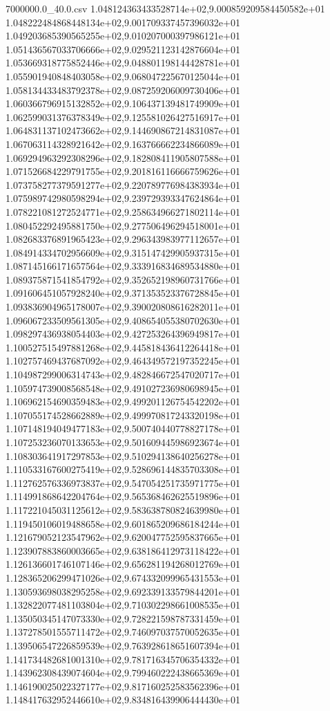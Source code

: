 \begin{filecontents*}{7000000.0_40.0.csv}
1.048124363433528714e+02,9.000859209584450582e+01
1.048222484868448134e+02,9.001709337457396032e+01
1.049203685390565255e+02,9.010207000397986121e+01
1.051436567033706666e+02,9.029521123142876604e+01
1.053669318775852446e+02,9.048801198144428781e+01
1.055901940848403058e+02,9.068047225670125044e+01
1.058134433483792378e+02,9.087259206009730406e+01
1.060366796915132852e+02,9.106437139481749909e+01
1.062599031376378349e+02,9.125581026427516917e+01
1.064831137102473662e+02,9.144690867214831087e+01
1.067063114328921642e+02,9.163766662234866089e+01
1.069294963292308296e+02,9.182808411905807588e+01
1.071526684229791755e+02,9.201816116666759626e+01
1.073758277379591277e+02,9.220789776984383934e+01
1.075989742980598294e+02,9.239729393347624864e+01
1.078221081272524771e+02,9.258634966271802114e+01
1.080452292495881750e+02,9.277506496294518001e+01
1.082683376891965423e+02,9.296343983977112657e+01
1.084914334702956609e+02,9.315147429905937315e+01
1.087145166171657564e+02,9.333916834689534880e+01
1.089375871541854792e+02,9.352652198960731766e+01
1.091606451057928240e+02,9.371353523376728845e+01
1.093836904965178007e+02,9.390020808616282011e+01
1.096067233509561305e+02,9.408654055380702630e+01
1.098297436938054403e+02,9.427253264396949817e+01
1.100527515497881268e+02,9.445818436412264418e+01
1.102757469437687092e+02,9.464349572197352245e+01
1.104987299006314743e+02,9.482846672547020717e+01
1.105974739008568548e+02,9.491027236980698945e+01
1.106962154690359483e+02,9.499201126754542202e+01
1.107055174528662889e+02,9.499970817243320198e+01
1.107148194049477183e+02,9.500740440778827178e+01
1.107253236070133653e+02,9.501609445986923674e+01
1.108303641917297853e+02,9.510294138640256278e+01
1.110533167600275419e+02,9.528696144835703308e+01
1.112762576336973837e+02,9.547054251735971775e+01
1.114991868642204764e+02,9.565368462625519896e+01
1.117221045031125612e+02,9.583638780824639980e+01
1.119450106019488658e+02,9.601865209686184244e+01
1.121679052123547962e+02,9.620047752595837665e+01
1.123907883860003665e+02,9.638186412973118422e+01
1.126136601746107146e+02,9.656281194268012769e+01
1.128365206299471026e+02,9.674332099965431553e+01
1.130593698038295258e+02,9.692339133579844201e+01
1.132822077481103804e+02,9.710302298661008535e+01
1.135050345147073330e+02,9.728221598787331459e+01
1.137278501555711472e+02,9.746097037570052635e+01
1.139506547226859539e+02,9.763928618651607394e+01
1.141734482681001310e+02,9.781716345706354332e+01
1.143962308439074604e+02,9.799460222438665369e+01
1.146190025022327177e+02,9.817160252583562396e+01
1.148417632952446610e+02,9.834816439906444430e+01

\end{filecontents*}
